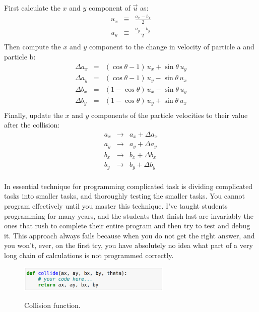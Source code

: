 First calculate the $x$ and $y$ component of $\vec{u}$ as:
\begin{eqnarray*}
u_x &\equiv& \frac{a_x - b_x}{2} \\
u_y &\equiv& \frac{a_y - b_y}{2} \\
\end{eqnarray*}
Then compute the $x$ and $y$ component to the change in velocity of particle a and particle b:
\begin{eqnarray*}
  \Delta a_x &=& (\cos\theta - 1) \, u_x + \sin\theta \, u_y \\
  \Delta a_y &=& (\cos\theta - 1) \, u_y - \sin\theta \,  u_x \\
  \Delta b_x &=& (1-\cos\theta) \, u_x - \sin\theta \, u_y \\
  \Delta b_y &=& (1-\cos\theta) \, u_y + \sin\theta \,  u_x \\
\end{eqnarray*}
Finally, update the $x$ and $y$ components of the particle velocities to their value after the collision:
\begin{eqnarray*}
  a_x &\to& a_x + \Delta a_x \\
  a_y &\to& a_y + \Delta a_y \\
  b_x &\to& b_x + \Delta b_x \\
  b_y &\to& b_y + \Delta b_y \\
\end{eqnarray*}

In essential technique for programming complicated task is dividing
complicated tasks into smaller tasks, and thoroughly testing the
smaller tasks.  You cannot program effectively until you master this
technique.  I've taught students programming for many years, and the
students that finish last are invariably the ones that rush to
complete their entire program and then try to test and debug it.  This
approach always fails because when you do not get the right answer,
and you won't, ever, on the first try, you have absolutely no idea
what part of a very long chain of calculations is not programmed
correctly.

\begin{figure}[htbp]
\begin{center}
\includegraphics[width=0.65\textwidth]{figs/maxwellboltzman/collide.png} \\
\caption{Collision function.}
\label{fig:collfunc}
\end{center}
\end{figure}



